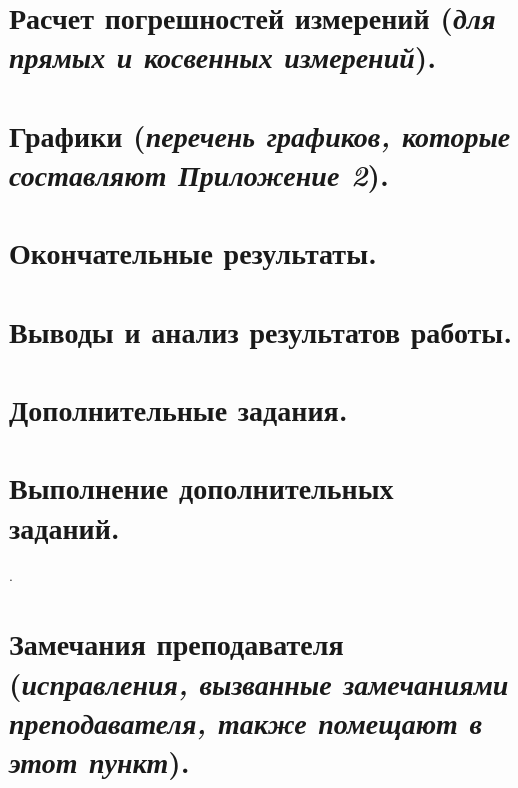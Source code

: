 \begin{flushleft}
\section{Расчет погрешностей измерений (\textit{для прямых и косвенных измерений}).}

\section{Графики (\textit{перечень графиков, которые составляют Приложение 2}).}


\section{Окончательные результаты.}


\section{Выводы и анализ результатов работы.} 

\section{Дополнительные задания.}
\bigskip

\section{Выполнение дополнительных заданий.}. 
\section{Замечания преподавателя (\textit{исправления, вызванные замечаниями преподавателя, также помещают в этот пункт}).} 


\bigskip
\end{flushleft}

